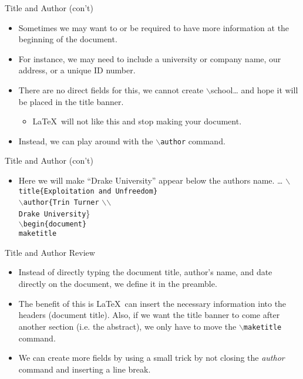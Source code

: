 \documentclass[pdf]{prosper}
\begin{document}
\begin{slide}{Title and Author (con't)}
	\begin{itemize}
		\item Sometimes we may want to or be required to have more information at the beginning of the document.
		\item For instance, we may need to include a university or company name, our address, or a unique ID number.
		\item There are no direct fields for this, we cannot create $\backslash$school{\ldots} and hope it will be placed in the title banner.
			\begin{itemize}
				\item \LaTeX\ will not like this and stop making your document.
			\end{itemize}
		\item Instead, we can play around with the \texttt{$\backslash$author} command.
	\end{itemize}
\end{slide}
\begin{slide}{Title and Author (con't)}
	\begin{itemize}
		\item Here we will make ``Drake University'' appear below the authors name.
			\ldots
			\texttt{$\backslash$title\{Exploitation and Unfreedom\}} \\
			\texttt{$\backslash$author\{Trin Turner} $\backslash$$\backslash$ \\
				\texttt{Drake University}\} \\
			\texttt{$\backslash$begin\{document\}} \\
			\texttt{maketitle}
	\end{itemize}
\end{slide}
\begin{slide}{Title and Author Review}
	\begin{itemize}
		\item Instead of directly typing the document title, author's name, and date directly on the document, we define it in the preamble.
		\item The benefit of this is \LaTeX\ can insert the necessary information into the headers (document title). Also, if we want the title banner to come after another section (i.e. the abstract), we only have to move the \texttt{$\backslash$maketitle} command.
		\item We can create more fields by using a small trick by not closing the \textit{author} command and inserting a line break.
	\end{itemize}
\end{slide}
\end{document}
